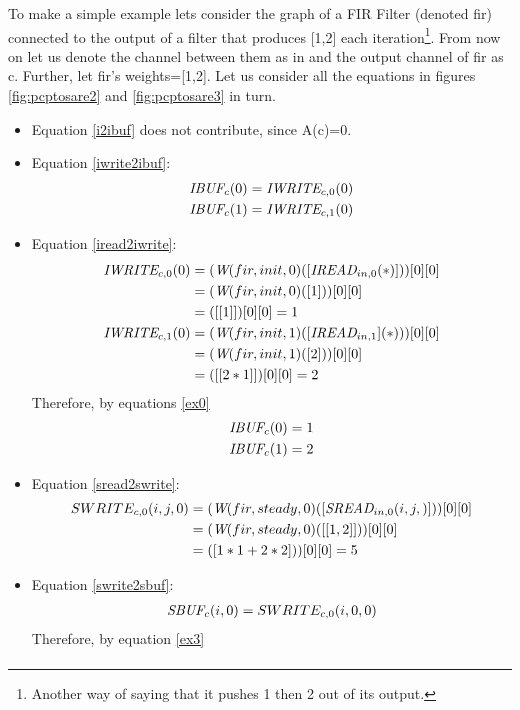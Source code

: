 To make a simple example lets consider the graph of a FIR Filter (denoted fir) connected to the output of a filter that produces [1,2] each iteration\footnote{Another way of saying that it pushes 1 then 2 out of its output.}. From now on let us denote the channel between them as in and the output channel of fir as c. Further, let fir's weights=[1,2]. Let us consider all the equations in figures \ref{fig:pcptosare2} and \ref{fig:pcptosare3} in turn.
\begin{itemize}
\item Equation \ref{i2ibuf} does not contribute, since A(c)=0.
\item Equation \ref{iwrite2ibuf}:
\begin{align}
\mbox{\it IBUF}_c(0)&=\mbox{\it IWRITE}_{c,0}(0)\label{ex0}\\
\mbox{\it IBUF}_c(1)&=\mbox{\it IWRITE}_{c,1}(0)\nonumber
\end{align}
\item Equation \ref{iread2iwrite}:
\begin{align}
\mbox{\it IWRITE}_{c,0}(0)&=(\mbox{\it W}(fir,init,0)([\mbox{\it IREAD}_{in,0}(*)]))[0][0]\nonumber\\
&=(\mbox{\it W}(fir,init,0)([1]))[0][0]\nonumber\\
&=([[1]])[0][0]=1\label{ex1}\\
\mbox{\it IWRITE}_{c,1}(0)&=(\mbox{\it W}(fir,init,1)([\mbox{\it IREAD}_{in,1}](*)))[0][0]\nonumber\\
&=(\mbox{\it W}(fir,init,1)([2]))[0][0]\nonumber\\
&=([[2*1]])[0][0]=2\nonumber
\end{align}
Therefore, by equations \ref{ex0}
\begin{align}
\mbox{\it IBUF}_c(0)&=1\label{ex2}\\
\mbox{\it IBUF}_c(1)&=2\nonumber
\end{align}
\item Equation \ref{sread2swrite}:
\begin{align}
SWRITE_{c,0}(i,j,0)&=(\mt{W}(fir,steady,0)([\mt{SREAD}_{in,0}(i,j,\*)]))[0][0]\nonumber\\
&=(\mt{W}(fir,steady,0)([[1,2]]))[0][0]\label{ex3}\\
&=([1*1+2*2]))[0][0]=5\nonumber
\end{align}
\item Equation \ref{swrite2sbuf}:
\begin{align}
\mbox{\it SBUF}_c(i,0)=SWRITE_{c,0}(i,0,0)\label{ex4}
\end{align}
Therefore, by equation \ref{ex3}
\begin{align}

\end{align}
\end{itemize}
